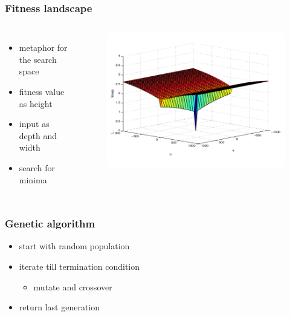 \begin{frame}
	\frametitle{Fitness landscape}
	
	\begin{columns}[c]
		

		\begin{itemize}
			\item metaphor for the search space
			\item fitness value as height
			\item input as depth and width
			\item search for minima
		\end{itemize}
		
		\begin{figure}
			\includegraphics[width=1\textwidth]{figures/complex_landscape}
		\end{figure}
		
		
	\end{columns}
	
\end{frame}

\begin{frame}
	\frametitle{Genetic algorithm}
		
	\begin{itemize}
		\item start with random population
		\item iterate till termination condition
		\begin{itemize}
			\item mutate and crossover
		\end{itemize}
		\item return last generation
	\end{itemize}
		
	
\end{frame}

